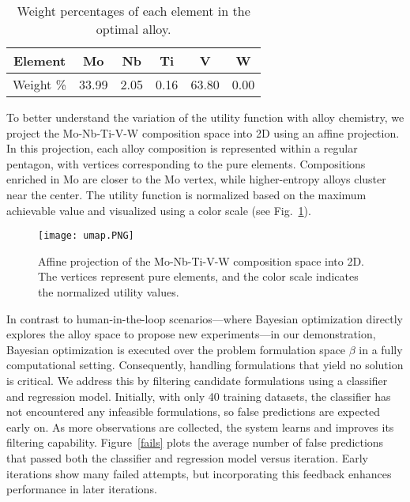 \documentclass[final,5p,times,twocolumn]{elsarticle}
\begin{document}
\begin{table}[htb!]
\centering
\caption{Optimal property values yielding the highest utility. Here, $CP$ denotes Cauchy pressure, $\sigma_y$ denotes yield strength, $\rho$ denotes density, and $\Delta T$ denotes the solidification range.}
\label{Properties}
\end{table}

\begin{table}[htb!]
\centering
\caption{Weight percentages of each element in the optimal alloy.}
\label{chemistry}
\begin{tabular}{cccccc}
\hline
Element   & Mo    & Nb   & Ti   & V     & W    \\ \hline
Weight \% & 33.99 & 2.05 & 0.16 & 63.80 & 0.00 \\ \hline
\end{tabular}
\end{table}

To better understand the variation of the utility function with alloy chemistry, we project the Mo-Nb-Ti-V-W composition space into 2D using an affine projection. In this projection, each alloy composition is represented within a regular pentagon, with vertices corresponding to the pure elements. Compositions enriched in Mo are closer to the Mo vertex, while higher-entropy alloys cluster near the center. The utility function is normalized based on the maximum achievable value and visualized using a color scale (see Fig.~\ref{umap}).

\begin{figure}[htb!]
\centering
\texttt{[image: umap.PNG]}
\caption{Affine projection of the Mo-Nb-Ti-V-W composition space into 2D. The vertices represent pure elements, and the color scale indicates the normalized utility values.}
\label{umap}
\end{figure}

In contrast to human-in-the-loop scenarios—where Bayesian optimization directly explores the alloy space to propose new experiments—in our demonstration, Bayesian optimization is executed over the problem formulation space $\beta$ in a fully computational setting. Consequently, handling formulations that yield no solution is critical. We address this by filtering candidate formulations using a classifier and regression model. Initially, with only 40 training datasets, the classifier has not encountered any infeasible formulations, so false predictions are expected early on. As more observations are collected, the system learns and improves its filtering capability. Figure~\ref{fails} plots the average number of false predictions that passed both the classifier and regression model versus iteration. Early iterations show many failed attempts, but incorporating this feedback enhances performance in later iterations.
\end{document}
